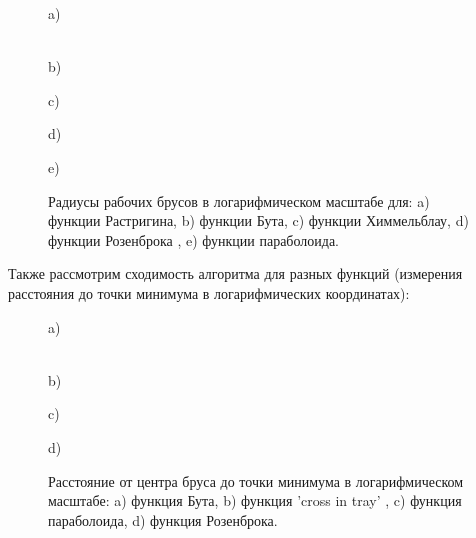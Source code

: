 \documentclass[a4paper]{article}
\begin{document}
\begin{figure}[H]
\begin{minipage}[h]{0.5\linewidth}
 a) \\
\end{minipage}
\hfill
\begin{minipage}[h]{0.5\linewidth}
 \\b)
\end{minipage}
\vfill
\begin{minipage}[h]{0.5\linewidth}
 c) \\
\end{minipage}
\hfill
\begin{minipage}[h]{0.5\linewidth}
 d) \\
\end{minipage}
\vfill
\begin{minipage}[h]{0.5\linewidth}
 e) \\
\end{minipage}
\caption{Радиусы рабочих брусов в логарифмическом масштабе для: a) функции Растригина, b) функции Бута, c) функции Химмельблау, d) функции Розенброка , e) функции параболоида.}
\label{ris:radius_blocks}
\end{figure}

\newpage
Также рассмотрим сходимость алгоритма для разных функций (измерения расстояния до точки минимума в логарифмических координатах):
\begin{figure}[H]
\begin{minipage}[h]{0.5\linewidth}
 a) \\
\end{minipage}
\hfill
\begin{minipage}[h]{0.5\linewidth}
 \\b)
\end{minipage}
\vfill
\begin{minipage}[h]{0.5\linewidth}
 c) \\
\end{minipage}
\hfill
\begin{minipage}[h]{0.5\linewidth}
 d) 
\end{minipage}
\caption{Расстояние от центра бруса до точки минимума в логарифмическом масштабе: a) функция Бута, b) функция 'cross in tray' , c) функция параболоида, d) функция Розенброка.}
\label{ris:conv_centres_blocks}
\end{figure}
\end{document}
